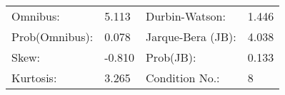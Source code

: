 \begin{table}[ht]
\begin{center}
\begin{tabular}{llll}
\hline
Omnibus:       & 5.113  & Durbin-Watson:    & 1.446  \\
Prob(Omnibus): & 0.078  & Jarque-Bera (JB): & 4.038  \\
Skew:          & -0.810 & Prob(JB):         & 0.133  \\
Kurtosis:      & 3.265  & Condition No.:    & 8      \\
\hline
\end{tabular}
\end{center}
\end{table}
\bigskip
